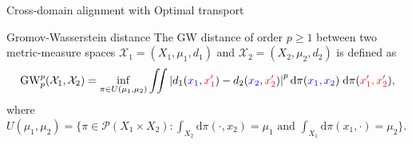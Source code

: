 \documentclass{beamer}
\newcommand{\gw}{\text{GW}}
\newcommand{\cX}{\mathcal X}
\newcommand{\rmd}{\mathrm{d}}
\begin{document}
\begin{frame}{Cross-domain alignment with Optimal transport}
  \vspace{-0.6cm}
  \scriptsize
  \begin{block}{Gromov-Wasserstein distance \parencite{Memoli07,Memoli11}}
  The GW distance of order $p \geq 1$ between two metric-measure spaces
  $\cX_1 = (X_1, \mu_1, d_1)$ and $\cX_2 = (X_2, \mu_2, d_2)$ is defined as
  \begin{align*}
    \gw_p^p(\cX_1, \cX_2) = \inf_{\pi \in U(\mu_1, \mu_2)}
    \iint \left| d_1({\color{blue}{x_1}}, {\color{red}{x_1'}}) - d_2({\color{blue}{x_2}}, {\color{red}{x_2'}}) \right|^p
    \rmd\pi({\color{blue}{x_1, x_2}}) \; \rmd\pi({\color{red}{x_1', x_2'}}),
  \end{align*}
  where $U(\mu_1, \mu_2) = \{ \pi \in \mathcal P(X_1 \times X_2): \int_{X_2} \rmd\pi(\cdot, x_2) = \mu_1 \text{ and } \int_{X_1} \rmd\pi(x_1, \cdot) = \mu_2 \}$.
\end{block}



\end{frame}
\end{document}
